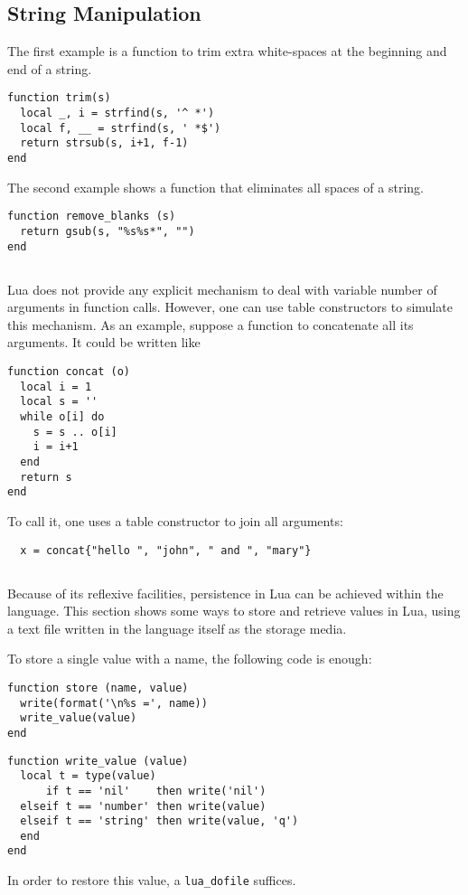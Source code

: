 \subsection{String Manipulation} \label{exstring}

The first example is a function to trim extra white-spaces at the beginning
and end of a string.
\begin{verbatim}
function trim(s)
  local _, i = strfind(s, '^ *')
  local f, __ = strfind(s, ' *$')
  return strsub(s, i+1, f-1)
end
\end{verbatim}

The second example shows a function that eliminates all spaces
of a string.
\begin{verbatim}
function remove_blanks (s)
  return gsub(s, "%s%s*", "")
end
\end{verbatim}


\subsection{}
Lua does not provide any explicit mechanism to deal with
variable number of arguments in function calls.
However, one can use table constructors to simulate this mechanism.
As an example, suppose a function to concatenate all its arguments.
It could be written like 
\begin{verbatim}
function concat (o)
  local i = 1
  local s = ''
  while o[i] do
    s = s .. o[i]
    i = i+1
  end
  return s
end
\end{verbatim}
To call it, one uses a table constructor to join all arguments:
\begin{verbatim}
  x = concat{"hello ", "john", " and ", "mary"}
\end{verbatim}

\subsection{}
Because of its reflexive facilities,
persistence in Lua can be achieved within the language.
This section shows some ways to store and retrieve values in Lua,
using a text file written in the language itself as the storage media.

To store a single value with a name,
the following code is enough:
\begin{verbatim}
function store (name, value)
  write(format('\n%s =', name))
  write_value(value)
end
\end{verbatim}
\begin{verbatim}
function write_value (value)
  local t = type(value)
      if t == 'nil'    then write('nil')
  elseif t == 'number' then write(value)
  elseif t == 'string' then write(value, 'q')
  end
end
\end{verbatim}
In order to restore this value, a \verb'lua_dofile' suffices.


